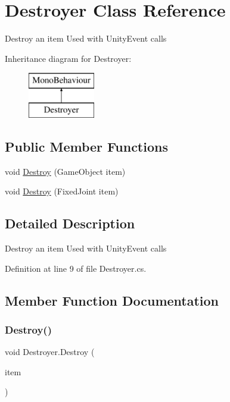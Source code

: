 \hypertarget{class_destroyer}{}\section{Destroyer Class Reference}
\label{class_destroyer}


Destroy an item Used with Unity\+Event calls  


Inheritance diagram for Destroyer\+:\begin{figure}[H]
\begin{center}
\leavevmode
\includegraphics[height=2.000000cm]{class_destroyer}
\end{center}
\end{figure}
\subsection*{Public Member Functions}
\begin{DoxyCompactItemize}
\item 
void \mbox{\hyperlink{class_destroyer_a0df81ee93f4d2ee9e37f327bcbca3864}{Destroy}} (Game\+Object item)
\item 
void \mbox{\hyperlink{class_destroyer_acd30f0513fecf0c4f08ffeb6c755f04b}{Destroy}} (Fixed\+Joint item)
\end{DoxyCompactItemize}


\subsection{Detailed Description}
Destroy an item Used with Unity\+Event calls 



Definition at line 9 of file Destroyer.\+cs.



\subsection{Member Function Documentation}
\mbox{\label{class_destroyer_a0df81ee93f4d2ee9e37f327bcbca3864}} 
\subsubsection{\texorpdfstring{Destroy()}{Destroy()}\hspace{0.1cm}{\footnotesize\ttfamily [1/2]}}
{\footnotesize\ttfamily void Destroyer.\+Destroy (\begin{DoxyParamCaption}\item[{Game\+Object}]{item }\end{DoxyParamCaption})}



